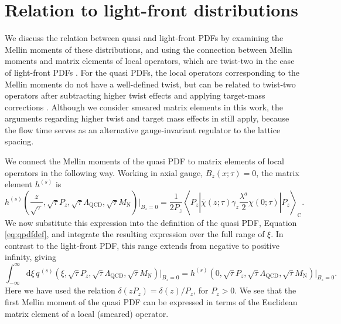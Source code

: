 \section{\label{sec:spdf}Relation to light-front distributions}

We discuss the relation between quasi and light-front PDFs by examining the 
Mellin moments of these distributions, and using the connection between 
Mellin moments and matrix elements of local operators, which are twist-two in 
the case of light-front PDFs \cite{Christ:1972ms}. For the quasi PDFs, the 
local operators corresponding to the Mellin moments do not have a well-defined 
twist, but can be related to twist-two operators after subtracting higher 
twist effects and applying target-mass 
corrections \cite{Lin:2014zya,Alexandrou:2015rja}. Although we 
consider smeared matrix elements in this work, the arguments regarding higher twist and 
target mass effects in \cite{Lin:2014zya,Alexandrou:2015rja} still apply, 
because the flow time serves as an alternative
gauge-invariant regulator to the lattice spacing.

We connect the Mellin moments of the quasi PDF to matrix elements of 
local operators in the following way. Working in axial gauge, $B_z(x;\tau)=0$, 
the 
matrix element $h^{(s)}$ is
\begin{equation}\label{eq:hAzdef}
h^{(s)}\left(\frac{z}{\sqrt{\tau}},\sqrt{\tau}P_z,\sqrt{\tau}\Lambda_{\mathrm{
QCD}},
\sqrt{\tau}
M_\mathrm{N}\right)\Big|_{B_z=0} = 
\frac{1}{2P_z}\left\langle 
P_z \left| \overline{\chi}(z;\tau) 
\gamma_z\frac{\lambda^a}{2}\chi(0;\tau)\right| 
P_z\right\rangle_\mathrm{C}.
\end{equation}
We now substitute this expression into the definition of the quasi PDF, 
Equation \eqref{eq:qpdfdef}, and integrate the resulting
expression over the full range of $\xi$. In contrast to the light-front 
PDF, this range extends from negative to positive infinity, giving
\begin{equation}
\int_{-\infty}^\infty 
\mathrm{d}\xi\, 
q^{\,(s)}\left(\xi,\sqrt{\tau}P_z,\sqrt{\tau}\Lambda_{\mathrm{QCD}},\sqrt{\tau}
M_\mathrm{N}\right)\Big|_{B_z=0} 
= 
h^{(s)}(0,\sqrt{\tau}P_z,\sqrt{\tau}\Lambda_{\mathrm{QCD}},\sqrt{\tau}M_\mathrm{
N}
)\Big|_{B_z=0}.
\end{equation}
Here we have used the relation $\delta(zP_z) = 
\delta(z)/P_z$, for $P_z>0$. We see that the first Mellin moment of the quasi 
PDF can be expressed in terms of the Euclidean matrix element of a local 
(smeared) operator.

